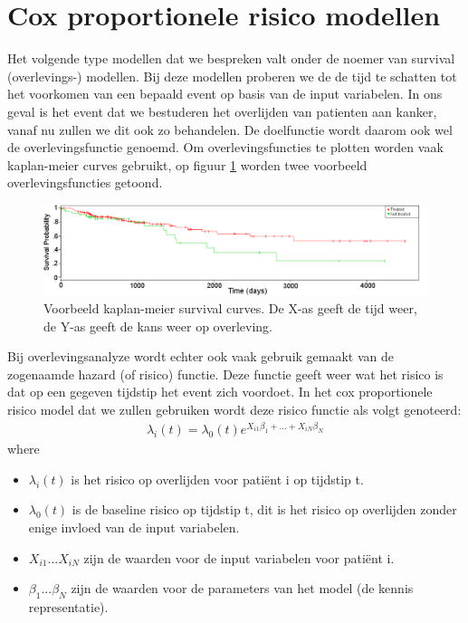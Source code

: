 \section{Cox proportionele risico modellen}
Het volgende type modellen dat we bespreken valt onder de noemer van survival (overlevings-) modellen. Bij deze modellen proberen we de de tijd te schatten tot het voorkomen van een bepaald event op basis van de input variabelen. In ons geval is het event dat we bestuderen het overlijden van patienten aan kanker, vanaf nu zullen we dit ook zo behandelen. De doelfunctie wordt daarom ook wel de overlevingsfunctie genoemd. Om overlevingsfuncties te plotten worden vaak kaplan-meier curves gebruikt, op figuur \ref{fig:D:cox-example-kaplan-meier} worden twee voorbeeld overlevingsfuncties getoond.	
\begin{figure}
	\centering
	\includegraphics[scale=0.4]{images/example_kaplan_meier_curve}
	\caption{Voorbeeld kaplan-meier survival curves. De X-as geeft de tijd weer, de Y-as geeft de kans weer op overleving.}
	\label{fig:D:cox-example-kaplan-meier}
\end{figure}
Bij overlevingsanalyze wordt echter ook vaak gebruik gemaakt van de zogenaamde hazard (of risico) functie. Deze functie geeft weer wat het risico is dat op een gegeven tijdstip het event zich voordoet. In het cox proportionele risico model dat we zullen gebruiken wordt deze risico functie als volgt genoteerd:
\begin{equation}
\begin{split}
\lambda_{i}(t) = \lambda_{0}(t)e^{X_{i1}\beta_{1} + ... + X_{iN}\beta_{N}}
\end{split}
\end{equation}
where
\begin{itemize}
	\item $\lambda_{i}(t)$ is het risico op overlijden voor pati\"ent i op tijdstip t.
	\item $\lambda_{0}(t)$ is de baseline risico op tijdstip t, dit is het risico op overlijden zonder enige invloed van de input variabelen.
	\item $X_{i1} ... X_{iN}$ zijn de waarden voor de input variabelen voor pati\"ent i.
	\item $\beta_{1} ... \beta_{N}$ zijn de waarden voor de parameters van het model (de kennis representatie).
\end{itemize}

